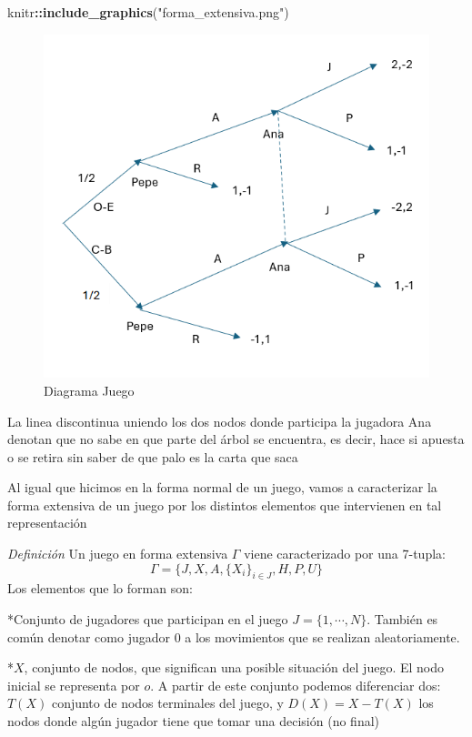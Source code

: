 \documentclass[12pt,a4paper,]{book}
\newenvironment{Shaded}{\begin{snugshade}}{\end{snugshade}}
\newcommand{\FunctionTok}[1]{\textcolor[rgb]{0.13,0.29,0.53}{\textbf{#1}}}
\newcommand{\NormalTok}[1]{#1}
\newcommand{\SpecialCharTok}[1]{\textcolor[rgb]{0.81,0.36,0.00}{\textbf{#1}}}
\newcommand{\StringTok}[1]{\textcolor[rgb]{0.31,0.60,0.02}{#1}}
\numberwithin{dummy}{section}
\theoremstyle{ocrenumbox}
\theoremstyle{blacknumex}
\theoremstyle{blacknumbox}
\theoremstyle{ocrenum}
\theoremstyle{ocrenum}
\begin{document}
\begin{Shaded}
\begin{Highlighting}[]
\NormalTok{knitr}\SpecialCharTok{::}\FunctionTok{include\_graphics}\NormalTok{(}\StringTok{"forma\_extensiva.png"}\NormalTok{)}
\end{Highlighting}
\end{Shaded}

\begin{figure}[H]

{\centering \includegraphics[width=0.8\linewidth]{forma_extensiva} 

}

\caption{\label{forma_extensiva}Diagrama Juego}\label{fig:forma_extensiva}
\end{figure}

La linea discontinua uniendo los dos nodos donde participa la jugadora
Ana denotan que no sabe en que parte del árbol se encuentra, es decir,
hace si apuesta o se retira sin saber de que palo es la carta que saca

Al igual que hicimos en la forma normal de un juego, vamos a
caracterizar la forma extensiva de un juego por los distintos elementos
que intervienen en tal representación

\emph{Definición} Un juego en forma extensiva \(\Gamma\) viene
caracterizado por una 7-tupla:
\[\Gamma=\{J,X,A,\{X_i\}_{i \in J},H,P,U \}\] Los elementos que lo
forman son:

*Conjunto de jugadores que participan en el juego \(J=\{1,\cdots,N\}\).
También es común denotar como jugador 0 a los movimientos que se
realizan aleatoriamente.

*\(X\), conjunto de nodos, que significan una posible situación del
juego. El nodo inicial se representa por \(o\). A partir de este
conjunto podemos diferenciar dos: \(T(X)\) conjunto de nodos terminales
del juego, y \(D(X)=X-T(X)\) los nodos donde algún jugador tiene que
tomar una decisión (no final)
\end{document}
